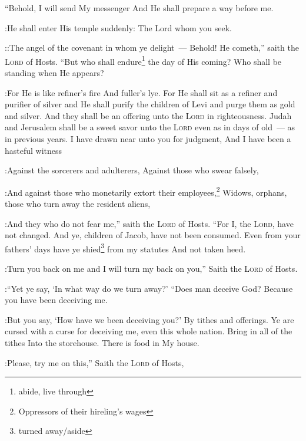 


\begin{enumerate*}[mode=unboxed]
     ``Behold, I will send My messenger And He shall prepare a way before me.%

:He shall enter His temple suddenly: The Lord whom you seek.%

::The angel of the covenant in whom ye delight~--- Behold! He cometh,'' saith the \textsc{Lord} of Hosts.%
     ``But who shall endure\footnote{abide, live through} the day of His coming? Who shall be standing when He appears?%

:For He is like refiner's fire And fuller's lye.%
     For He shall sit as a refiner and purifier of silver and He shall purify the children of Levi and purge them as gold and silver. And they shall be an offering unto the \textsc{Lord} in righteousness.%
     Judah and Jerusalem shall be a sweet savor unto the \textsc{Lord} even as in days of old~--- as in previous years.%
     I have drawn near unto you for judgment, And I have been a hasteful witness%

:Against the sorcerers and adulterers, Against those who swear falsely,%

:And against those who monetarily extort their employees,\footnote{Oppressors of their hireling's wages} Widows, orphans, those who turn away the resident aliens,%

:And they who do not fear me,'' saith the \textsc{Lord} of Hosts.%
     ``For I, the \textsc{Lord}, have not changed. And ye, children of Jacob, have not been consumed.%
     Even from your fathers' days have ye shied\footnote{turned away/aside} from my statutes And not taken heed.%

:Turn you back on me and I will turn my back on you,'' Saith the \textsc{Lord} of Hosts.%

:``Yet ye say, `In what way do we turn away?'%
     ``Does man deceive God? Because you have been deceiving me.%

:But you say, `How have we been deceiving you?' By tithes and offerings.%
     Ye are cursed with a curse for deceiving me, even this whole nation.%
     Bring in all of the tithes Into the storehouse. There is food in My house.%

:Please, try me on this,'' Saith the \textsc{Lord} of Hosts,%


\end{enumerate*}
